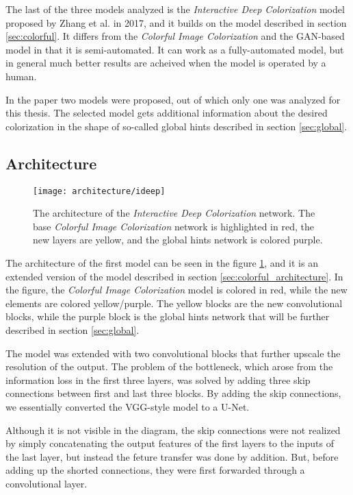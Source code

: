 The last of the three models analyzed is the \textit{Interactive Deep Colorization}
model proposed by Zhang et al. in 2017, and it builds on the model described 
in section \ref{sec:colorful}. It differs from the \textit{Colorful Image Colorization}
and the GAN-based model in that it is semi-automated. It can work as a fully-automated model, 
but in general much better results are acheived when the model is operated by a human. 

In the paper two models were proposed, out of which only one was analyzed for this thesis. 
The selected model gets additional information about the desired colorization in the 
shape of so-called global hints described in section \ref{sec:global}.

\subsection{Architecture}

\begin{figure}[!ht]
	\centering
	\texttt{[image: architecture/ideep]}
    \caption{The architecture of the \textit{Interactive Deep Colorization} network. 
	The base \textit{Colorful Image Colorization} network is highlighted in red, the new 
	layers are yellow, and the global hints network is colored purple.}
	\label{fig:architecture_ideep}
\end{figure}

The architecture of the first model can be seen in the figure \ref{fig:architecture_ideep}, 
and it is an extended version of the model described in section \ref{sec:colorful_architecture}. 
In the figure, the \textit{Colorful Image Colorization} model is colored in red, while 
the new elements are colored yellow/purple. The yellow blocks are the new convolutional 
blocks, while the purple block is the global hints network that will be further described
in section \ref{sec:global}.

The model was extended with two convolutional blocks that further upscale the resolution 
of the output. The problem of the bottleneck, which arose from the information loss in the 
first three layers, was solved by adding three skip connections between first and last three
blocks. By adding the skip connections, we essentially converted the VGG-style model to a
U-Net.


Although it is not visible in the diagram, the skip connections were not realized by 
simply concatenating the output features of the first layers to the inputs of the 
last layer, but instead the feture transfer was done by addition. But, before adding 
up the shorted connections, they were first forwarded through a convolutional layer.



